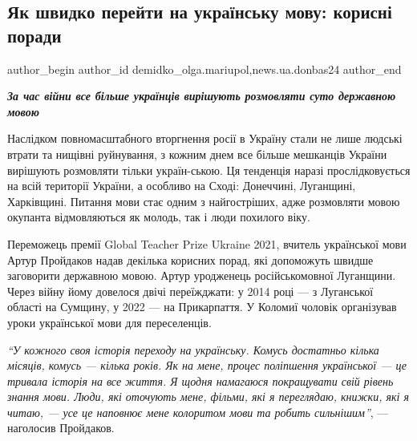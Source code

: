  
 
 
 
 
 
\subsection{Як швидко перейти на українську мову: корисні поради}
\label{sec:28_07_2022.stz.news.ua.donbas24.1.jak_shvydko_perejty_na_movu_porady}
 
\ifcmt
 author_begin
   author_id demidko_olga.mariupol,news.ua.donbas24
 author_end
\fi

\begin{center}
  \em\color{blue}\bfseries\Large
За час війни все більше українців вирішують розмовляти суто державною мовою
\end{center}

Наслідком повномасштабного вторгнення росії в Україну стали не лише людські
втрати та нищівні руйнування, з кожним днем все більше мешканців України
вирішують розмовляти тільки україн\hyp{}ською. Ця тенденція наразі прослідковується
на всій території України, а особливо на Сході: Донеччині, Луганщині,
Харківщині. Питання мови стає одним з найгостріших, адже розмовляти мовою
окупанта відмовляються як молодь, так і люди похилого віку.

Переможець премії Global Teacher Prize Ukraine 2021, вчитель української мови
Артур Пройдаков надав декілька корисних порад, які допоможуть швидше заговорити
державною мовою. Артур уродженець російськомовної Луганщини. Через війну йому
довелося двічі переїжджати: у 2014 році — з Луганської області на Сумщину, у
2022 — на Прикарпаття. У Коломиї чоловік організував уроки української мови для
переселенців.


\begin{leftbar}
\emph{\enquote{У кожного своя історія переходу на українську. Комусь достатньо кілька
місяців, комусь — кілька років. Як на мене, процес поліпшення
української — це тривала історія на все життя. Я щодня намагаюся
покращувати свій рівень знання мови. Люди, які оточують мене, фільми,
які я переглядаю, книжки, які я читаю, — усе це наповнює мене колоритом
мови та робить сильнішим}}, — наголосив Пройдаков.
\end{leftbar}

